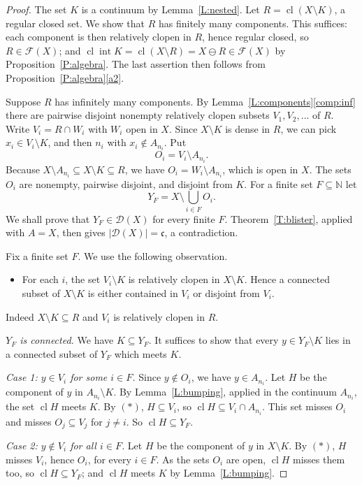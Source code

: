 \documentclass[11pt,reqno]{amsart}
\theoremstyle{plain}
\theoremstyle{definition}
\theoremstyle{remark}
\newcommand{\D}{\mathcal{D}}
\newcommand{\F}{\mathscr{F}}
\newcommand{\cl}{\operatorname{cl}}
\newcommand{\intr}{\operatorname{int}}
\newcommand{\N}{\mathbb{N}}
\newcommand{\cc}{\mathfrak{c}}
\newcommand{\rd}{\ominus}
\begin{document}
\begin{proof}
The set $K$ is a continuum by Lemma~\ref{L:nested}. Let $R=\cl(X\setminus K)$, a regular closed set. We show that $R$ has finitely many components. This suffices: each component is then relatively clopen in $R$, hence regular closed, so $R\in\F(X)$; and $\cl\intr K=\cl(X\setminus R)=X\rd R\in\F(X)$ by Proposition~\ref{P:algebra}. The last assertion then follows from Proposition~\ref{P:algebra}\ref{a2}.

Suppose $R$ has infinitely many components. By Lemma~\ref{L:components}\ref{comp:inf} there are pairwise disjoint nonempty relatively clopen subsets $V_1,V_2,\dots$ of $R$. Write $V_i=R\cap W_i$ with $W_i$ open in $X$. Since $X\setminus K$ is dense in $R$, we can pick $x_i\in V_i\setminus K$, and then $n_i$ with $x_i\notin A_{n_i}$. Put
\[
O_i=V_i\setminus A_{n_i}.
\]
Because $X\setminus A_{n_i}\subseteq X\setminus K\subseteq R$, we have $O_i=W_i\setminus A_{n_i}$, which is open in $X$. The sets $O_i$ are nonempty, pairwise disjoint, and disjoint from $K$. For a finite set $F\subseteq\N$ let
\[
Y_F=X\setminus\bigcup_{i\in F}O_i .
\]
We shall prove that $Y_F\in\D(X)$ for every finite $F$. Theorem~\ref{T:blister}, applied with $A=X$, then gives $|\D(X)|=\cc$, a contradiction.

Fix a finite set $F$. We use the following observation.
\begin{itemize}
\item[$(\ast)$] For each $i$, the set $V_i\setminus K$ is relatively clopen in $X\setminus K$. Hence a connected subset of $X\setminus K$ is either contained in $V_i$ or disjoint from $V_i$.
\end{itemize}
Indeed $X\setminus K\subseteq R$ and $V_i$ is relatively clopen in $R$.

\emph{$Y_F$ is connected.} We have $K\subseteq Y_F$. It suffices to show that every $y\in Y_F\setminus K$ lies in a connected subset of $Y_F$ which meets $K$.

\emph{Case 1: $y\in V_i$ for some $i\in F$.} Since $y\notin O_i$, we have $y\in A_{n_i}$. Let $H$ be the component of $y$ in $A_{n_i}\setminus K$. By Lemma~\ref{L:bumping}, applied in the continuum $A_{n_i}$, the set $\cl H$ meets $K$. By $(\ast)$, $H\subseteq V_i$, so $\cl H\subseteq V_i\cap A_{n_i}$. This set misses $O_i$ and misses $O_j\subseteq V_j$ for $j\neq i$. So $\cl H\subseteq Y_F$.

\emph{Case 2: $y\notin V_i$ for all $i\in F$.} Let $H$ be the component of $y$ in $X\setminus K$. By $(\ast)$, $H$ misses $V_i$, hence $O_i$, for every $i\in F$. As the sets $O_i$ are open, $\cl H$ misses them too, so $\cl H\subseteq Y_F$; and $\cl H$ meets $K$ by Lemma~\ref{L:bumping}.


\end{proof}
\end{document}
